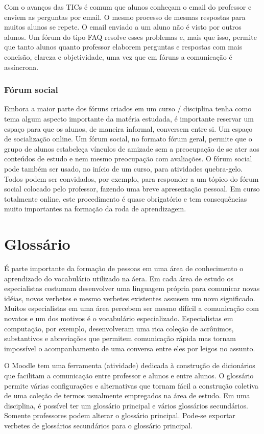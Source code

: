 Com o avanços das TICs é comum que alunos conheçam o email do professor e enviem as perguntas por email. O mesmo processo de mesmas respostas para muitos alunos se repete. O email enviado a um aluno não é visto por outros alunos. Um fórum do tipo FAQ resolve esses problemas e, mais que isso, permite que tanto alunos quanto professor elaborem perguntas e respostas com mais concisão, clareza e objetividade, uma vez que em fóruns a comunicação é assíncrona.
\subsubsection{Fórum social}
Embora a maior parte dos fóruns criados em um curso / disciplina tenha como tema algum aspecto importante da matéria estudada, é importante reservar um espaço para que os alunos, de maneira informal, conversem entre si. Um espaço de socialização online. Um fórum social, no formato fórum geral, permite que o grupo de alunos estabeleça vínculos de amizade sem a preocupação de se ater aos conteúdos de estudo e nem mesmo preocupação com avaliações. O fórum social pode também ser usado,  no início de um curso, para atividades quebra-gelo. Todos podem ser convidados, por exemplo, para responder a um tópico do fórum social colocado pelo professor, fazendo uma breve apresentação pessoal. Em curso totalmente online, este procedimento é quase obrigatório e tem consequências muito importantes na formação da roda de aprendizagem.
\section{Glossário}
É parte importante da formação de pessoas em uma área de conhecimento o aprendizado do vocabulário utilizado na áera. Em cada área de estudo os especialistas costumam desenvolver uma linguagem própria para comunicar novas idéias, novos verbetes  e mesmo verbetes existentes assusem um novo significado. Muitos especialistas em uma área percebem ser mesmo difícil a comunicação com novatos e um dos motivos é o vocabulário especializado. Especialistas em computação, por exemplo, desenvolveram uma rica coleção de acrônimos, substantivos e abreviações que permitem comunicação rápida mas tornam impossível o acompanhamento de uma conversa entre eles por leigos no assunto.

O Moodle tem uma ferramenta (atividade) dedicada à construção de dicionários que facilitam a comunicação entre professor e alunos e entre alunos. O glossário permite várias configurações e alternativas que tornam fácil a construção coletiva de uma coleção de termos usualmente empregados na área de estudo. Em uma disciplina, é possível ter um glossário principal e vários glossários secundários. Somente professores podem alterar o glossário principal. Pode-se exportar verbetes de glossários secundários para o glossário principal.
